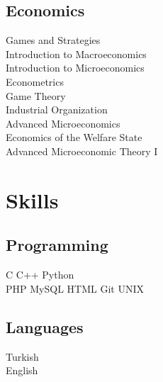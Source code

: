 \documentclass[letterpaper]{deedy-resume} %
\begin{document}
\begin{minipage}[t]{0.33\textwidth}
\subsection{Economics}

Games and Strategies \\
Introduction to Macroeconomics \\
Introduction to Microeconomics \\
Econometrics \\
Game Theory \\
Industrial Organization \\
Advanced Microeconomics \\
Economics of the Welfare State \\
Advanced Microeconomic Theory I

\sectionspace %


\section{Skills}

\subsection{Programming}

\sectionspace %

C \textbullet{} C++ \textbullet{} Python \\

PHP \textbullet{} MySQL \textbullet{} HTML \textbullet{} Git \textbullet{} UNIX \\

\sectionspace %

\subsection{Languages}

\sectionspace %

Turkish \\

English \\

\sectionspace %


\end{minipage} %
\end{document}
